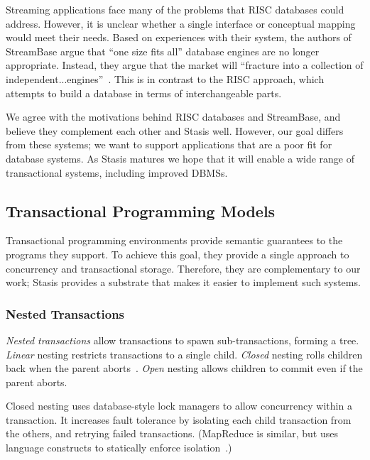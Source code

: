 \documentclass[letterpaper,twocolumn,10pt]{article}
\newcommand{\yad}{Stasis\xspace}
\begin{document}
Streaming applications face many of the problems that RISC databases
could address.  However, it is unclear whether a single interface or
conceptual mapping would meet their needs.  Based on experiences with
their system, the authors of StreamBase argue that ``one size fits
all'' database engines are no longer appropriate.  Instead, they argue that
the market will ``fracture into a collection of independent...engines''~\cite{oneSizeFitsAll}.  This is in contrast to the RISC
approach, which attempts to build a database in terms of
interchangeable parts.

We agree with the motivations behind RISC databases and StreamBase,
and believe they complement each other and \yad well.  However, our
goal differs from these systems; we want to support applications that
are a poor fit for database systems.  As \yad matures we 
hope that it will enable a wide range of transactional systems,
including improved DBMSs.

\subsection{Transactional Programming Models}

\label{sec:transactionalProgramming}

Transactional programming environments provide semantic guarantees to
the programs they support.  To achieve this goal, they provide a
single approach to concurrency and transactional storage.
Therefore, they are complementary to our work; \yad provides a
substrate that makes it easier to implement such systems.

\subsubsection{Nested Transactions}

{\em Nested transactions} allow transactions to spawn sub-transactions,
forming a tree.  {\em Linear} nesting
restricts transactions to a single child.  {\em Closed} nesting rolls
children back when the parent aborts~\cite{nestedTransactionBook}.
{\em Open} nesting allows children to commit even if the parent
aborts.

Closed nesting uses database-style lock managers to allow concurrency
within a transaction.  It increases fault tolerance by isolating each
child transaction from the others, and retrying failed
transactions.  (MapReduce is similar, but uses language constructs to
statically enforce isolation~\cite{mapReduce}.)
\end{document}
